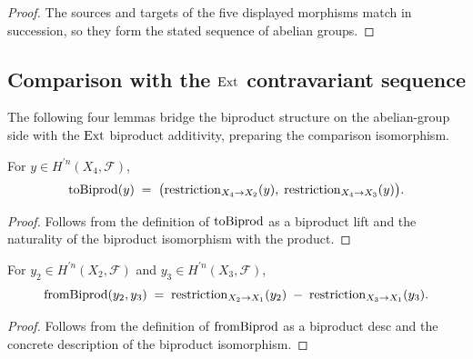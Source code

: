 \begin{proof}
  \leanok

  The sources and targets of the five displayed morphisms match in succession, so they form the stated sequence of abelian groups.
\end{proof}

\subsection{Comparison with the \(\operatorname{Ext}\) contravariant sequence}

The following four lemmas bridge the biproduct structure on the abelian-group side with the \(\operatorname{Ext}\) biproduct additivity, preparing the comparison isomorphism.

\begin{lemma}\label{mk-lem:Scheme_HModule_prime_toBiprod_apply}
  \leanok


  For \(y \in H^{\prime n}(X_4, \mathcal F)\),
  \[
    \operatorname{toBiprod}(y) \;=\; \bigl(\mathrm{restriction}_{X_4 \to X_2}(y),\; \mathrm{restriction}_{X_4 \to X_3}(y)\bigr).
  \]
\end{lemma}

\begin{proof}
  \leanok

  Follows from the definition of \(\operatorname{toBiprod}\) as a biproduct lift and the naturality of the biproduct isomorphism with the product.
\end{proof}

\begin{lemma}\label{mk-lem:Scheme_HModule_prime_fromBiprod_biprodIsoProd_inv_apply}
  \leanok


  For \(y_2 \in H^{\prime n}(X_2, \mathcal F)\) and \(y_3 \in H^{\prime n}(X_3, \mathcal F)\),
  \[
    \operatorname{fromBiprod}(y_2, y_3) \;=\; \mathrm{restriction}_{X_2 \to X_1}(y_2) \;-\; \mathrm{restriction}_{X_3 \to X_1}(y_3).
  \]
\end{lemma}

\begin{proof}
  \leanok

  Follows from the definition of \(\operatorname{fromBiprod}\) as a biproduct desc and the concrete description of the biproduct isomorphism.
\end{proof}

